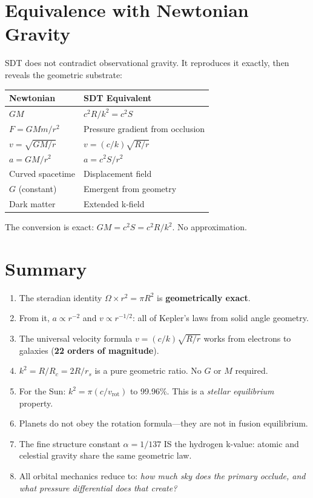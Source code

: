 \section{Equivalence with Newtonian Gravity}

SDT does not contradict observational gravity.  It reproduces it exactly, then reveals the geometric substrate:

\begin{center}
\begin{tabular}{ll}
\hline
\textbf{Newtonian} & \textbf{SDT Equivalent} \\
\hline
$GM$ & $c^2 R/k^2 = c^2 S$ \\
$F = GMm/r^2$ & Pressure gradient from occlusion \\
$v = \sqrt{GM/r}$ & $v = (c/k)\sqrt{R/r}$ \\
$a = GM/r^2$ & $a = c^2 S/r^2$ \\
Curved spacetime & Displacement field \\
$G$ (constant) & Emergent from geometry \\
Dark matter & Extended k-field \\
\hline
\end{tabular}
\end{center}

The conversion is exact: $GM = c^2 S = c^2 R/k^2$.  No approximation.


\section{Summary}

\begin{enumerate}
  \item The steradian identity $\Omega \times r^2 = \pi R^2$ is \textbf{geometrically exact}.
  \item From it, $a \propto r^{-2}$ and $v \propto r^{-1/2}$: all of Kepler's laws from solid angle geometry.
  \item The universal velocity formula $v = (c/k)\sqrt{R/r}$ works from electrons to galaxies (\textbf{22 orders of magnitude}).
  \item $k^2 = R/R_c = 2R/r_s$ is a pure geometric ratio.  No $G$ or $M$ required.
  \item For the Sun: $k^2 = \pi(c/v_{\text{rot}})$ to 99.96\%.  This is a \emph{stellar equilibrium} property.
  \item Planets do not obey the rotation formula---they are not in fusion equilibrium.
  \item The fine structure constant $\alpha = 1/137$ IS the hydrogen k-value: atomic and celestial gravity share the same geometric law.
  \item All orbital mechanics reduce to: \emph{how much sky does the primary occlude, and what pressure differential does that create?}
\end{enumerate}


